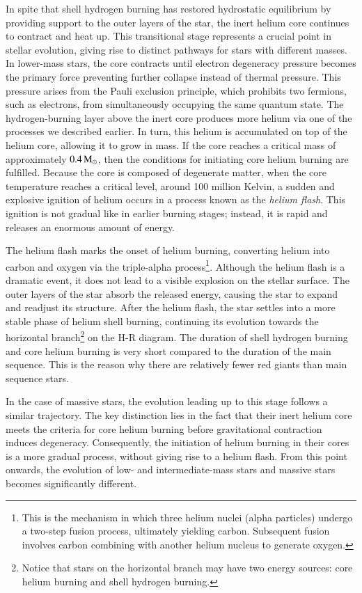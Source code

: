 \documentclass[main.tex]{subfiles}
\begin{document}
    In spite that shell hydrogen burning has restored hydrostatic equilibrium by providing support to the outer layers of the star, the inert helium core continues to contract and heat up.
    This transitional stage represents a crucial point in stellar evolution, giving rise to distinct pathways for stars with different masses. In lower-mass stars, the core contracts until electron degeneracy pressure becomes the primary force preventing further collapse instead of thermal pressure. This pressure arises from the Pauli exclusion principle, which prohibits two fermions, such as electrons, from simultaneously occupying the same quantum state. The hydrogen-burning layer above the inert core produces more helium via one of the processes we described earlier. In turn, this helium is accumulated on top of the helium core, allowing it to grow in mass. If the core reaches a critical mass of approximately $0.4\mathrm{\,M_\odot}$, then the conditions for initiating core helium burning are fulfilled. Because the core is composed of degenerate matter, when the core temperature reaches a critical level, around 100 million Kelvin, a sudden and explosive ignition of helium occurs in a process known as the \textit{helium flash}. This ignition is not gradual like in earlier burning stages; instead, it is rapid and releases an enormous amount of energy. 
    
    The helium flash marks the onset of helium burning, converting helium into carbon and oxygen via the triple-alpha process\footnote{This is the mechanism in which three helium nuclei (alpha particles) undergo a two-step fusion process, ultimately yielding carbon. Subsequent fusion involves carbon combining with another helium nucleus to generate oxygen.}.
    Although the helium flash is a dramatic event, it does not lead to a visible explosion on the stellar surface. The outer layers of the star absorb the released energy, causing the star to expand and readjust its structure. After the helium flash, the star settles into a more stable phase of helium shell burning, continuing its evolution towards the horizontal branch\footnote{Notice that stars on the horizontal branch may have two energy sources: core helium burning and shell hydrogen burning.} on the H-R diagram. The duration of shell hydrogen burning and core helium burning is very short compared to the duration of the main sequence. This is the reason why there are relatively fewer red giants than main sequence stars.

    In the case of massive stars, the evolution leading up to this stage follows a similar trajectory. The key distinction lies in the fact that their inert helium core meets the criteria for core helium burning before gravitational contraction induces degeneracy. Consequently, the initiation of helium burning in their cores is a more gradual process, without giving rise to a helium flash. From this point onwards, the evolution of low- and intermediate-mass stars and massive stars becomes significantly different. 
    
\end{document}
